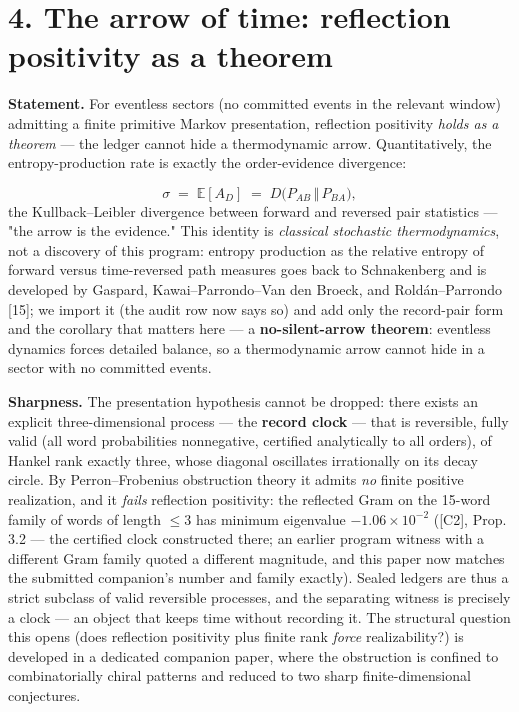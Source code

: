 \documentclass[11pt]{article}
\begin{document}
\section*{4. The arrow of time: reflection positivity as a theorem}
\textbf{Statement.}  For eventless sectors (no committed events in the relevant window) admitting a finite primitive Markov presentation, reflection positivity \emph{holds as a theorem} — the ledger cannot hide a thermodynamic arrow.  Quantitatively, the entropy-production rate is exactly the order-evidence divergence:

\[
\sigma \;=\; \mathbb E[A_D] \;=\; D\bigl(P_{AB}\,\Vert\,P_{BA}\bigr),
\]
the Kullback–Leibler divergence between forward and reversed pair statistics — "the arrow is the evidence."  This identity is \emph{classical stochastic thermodynamics}, not a discovery of this program: entropy production as the relative entropy of forward versus time-reversed path measures goes back to Schnakenberg and is developed by Gaspard, Kawai–Parrondo–Van den Broeck, and Roldán–Parrondo [15]; we import it (the audit row now says so) and add only the record-pair form and the corollary that matters here — a \textbf{no-silent-arrow theorem}: eventless dynamics forces detailed balance, so a thermodynamic arrow cannot hide in a sector with no committed events.

\textbf{Sharpness.}  The presentation hypothesis cannot be dropped: there exists an explicit three-dimensional process — the \textbf{record clock} — that is reversible, fully valid (all word probabilities nonnegative, certified analytically to all orders), of Hankel rank exactly three, whose diagonal oscillates irrationally on its decay circle.  By Perron–Frobenius obstruction theory it admits \emph{no} finite positive realization, and it \emph{fails} reflection positivity: the reflected Gram on the 15-word family of words of length $\le 3$ has minimum eigenvalue $-1.06\times 10^{-2}$ ([C2], Prop. 3.2 — the certified clock constructed there; an earlier program witness with a different Gram family quoted a different magnitude, and this paper now matches the submitted companion's number and family exactly).  Sealed ledgers are thus a strict subclass of valid reversible processes, and the separating witness is precisely a clock — an object that keeps time without recording it.  The structural question this opens (does reflection positivity plus finite rank \emph{force} realizability?) is developed in a dedicated companion paper, where the obstruction is confined to combinatorially chiral patterns and reduced to two sharp finite-dimensional conjectures.
\end{document}
